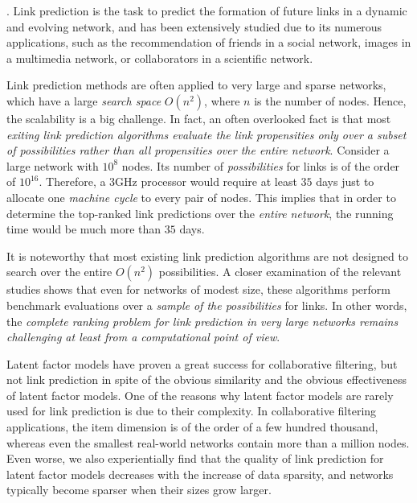 . Link prediction is the task to predict the formation of future links in a dynamic and evolving network, and has been extensively studied due to its numerous applications, such as the recommendation of friends in a social network, images in a multimedia network, or
collaborators in a scientific network.


Link prediction methods are often applied to very large and sparse networks, which have a large {\em search space} $O(n^2)$,
where $n$ is the number of nodes. Hence, the scalability is a big challenge. In fact, an often overlooked fact is that most {\em exiting link prediction algorithms evaluate the link propensities only over a subset of possibilities rather than all propensities over the entire network}. %
Consider a large network with $10^8$ nodes. Its number of {\em possibilities} for links
is of the order of $10^{16}$. Therefore, a 3GHz processor would
require at least $35$ days just to allocate one {\em machine cycle} to
every pair of nodes. This implies that in order to determine the
top-ranked link predictions over the {\em entire network}, the
running time would be much more than $35$ days.

It is noteworthy that most existing link prediction algorithms are not designed to search over the entire
$O(n^2)$ possibilities. A closer examination of the relevant
studies shows that even for networks of modest size, these
algorithms perform benchmark evaluations over a {\em
sample of the possibilities} for links.  In other
words, the {\em complete ranking problem for link prediction in
very large networks remains challenging at least from a
computational point of view}.


Latent factor models have proven a great success for
collaborative filtering, but not link prediction in spite of the obvious
similarity and
the obvious effectiveness of latent factor models. One of the reasons why latent factor models are rarely used for
link prediction is due to their complexity. In
collaborative filtering applications, the item dimension is of the
order of a few hundred thousand, whereas even the smallest  real-world networks contain more than a million nodes.
Even worse, we also experientially find that the quality of link prediction for latent factor models decreases with the increase of data sparsity,
and networks typically become sparser when their sizes grow larger.




